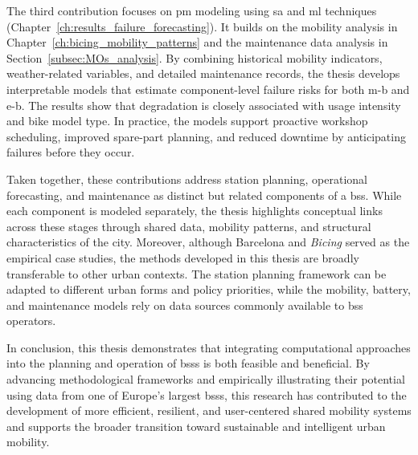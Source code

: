 The third contribution focuses on \ac{pm} modeling using \ac{sa} and \ac{ml} techniques (Chapter~\ref{ch:results_failure_forecasting}). It builds on the mobility analysis in Chapter~\ref{ch:bicing_mobility_patterns} and the maintenance data analysis in Section~\ref{subsec:MOs_analysis}. By combining historical mobility indicators, weather-related variables, and detailed maintenance records, the thesis develops interpretable models that estimate component-level failure risks for both \ac{m-b} and \ac{e-b}. The results show that degradation is closely associated with usage intensity and bike model type. In practice, the models support proactive workshop scheduling, improved spare-part planning, and reduced downtime by anticipating failures before they occur.

Taken together, these contributions address station planning, operational forecasting, and maintenance as distinct but related components of a \ac{bss}. While each component is modeled separately, the thesis highlights conceptual links across these stages through shared data, mobility patterns, and structural characteristics of the city. Moreover, although Barcelona and \textit{Bicing} served as the empirical case studies, the methods developed in this thesis are broadly transferable to other urban contexts. The station planning framework can be adapted to different urban forms and policy priorities, while the mobility, battery, and maintenance models rely on data sources commonly available to \ac{bss} operators.

In conclusion, this thesis demonstrates that integrating computational approaches into the planning and operation of \acp{bss} is both feasible and beneficial. By advancing methodological frameworks and empirically illustrating their potential using data from one of Europe's largest \acp{bss}, this research has contributed to the development of more efficient, resilient, and user-centered shared mobility systems and supports the broader transition toward sustainable and intelligent urban mobility.